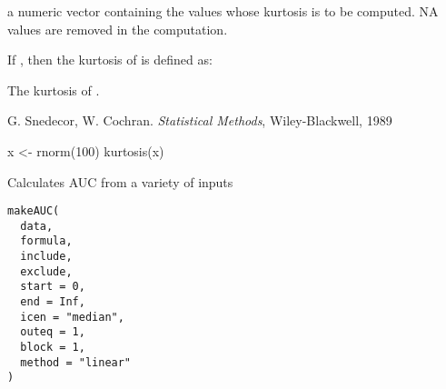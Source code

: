 \documentclass[a4paper]{book}
\begin{document}
%
\begin{Arguments}
\begin{ldescription}
\item[\code{x}] a numeric vector containing the values whose kurtosis is to be
computed. NA values are removed in the computation.
\end{ldescription}
\end{Arguments}
%
\begin{Details}\relax
If , then the kurtosis of 
is defined as: 
\end{Details}
%
\begin{Value}
The kurtosis of .
\end{Value}
%
\begin{References}\relax
G. Snedecor, W. Cochran. \emph{Statistical Methods}, 
Wiley-Blackwell, 1989
\end{References}
%
\begin{Examples}
\begin{ExampleCode}

x <- rnorm(100)
kurtosis(x)
\end{ExampleCode}
\end{Examples}
%
\begin{Description}\relax
Calculates AUC from a variety of inputs
\end{Description}
%
\begin{Usage}
\begin{verbatim}
makeAUC(
  data,
  formula,
  include,
  exclude,
  start = 0,
  end = Inf,
  icen = "median",
  outeq = 1,
  block = 1,
  method = "linear"
)
\end{verbatim}
\end{Usage}
%
\end{document}
